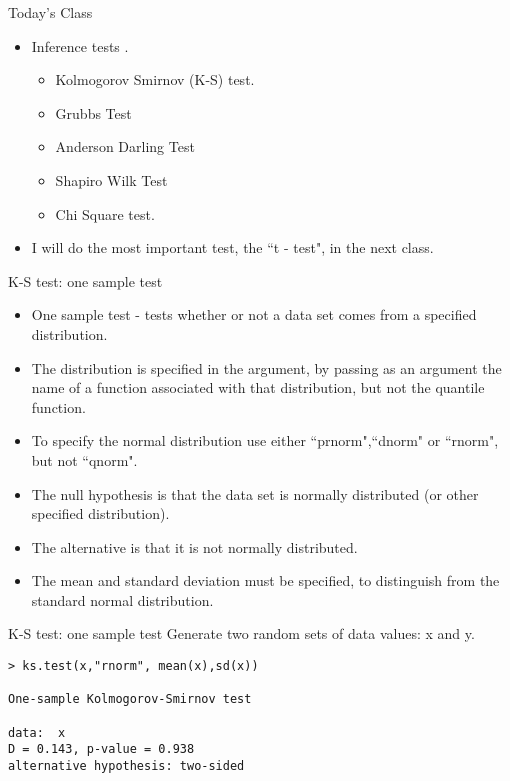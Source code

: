
{Today's Class}

\begin{itemize}
	\item Inference tests .
	\begin{itemize}
		\item Kolmogorov Smirnov (K-S) test.
		\item Grubbs Test
		\item Anderson Darling Test
		\item Shapiro Wilk Test
		\item Chi Square test.
	\end{itemize}
	\item I will do the most important test, the ``t - test", in the next class.
\end{itemize}




{K-S test: one sample test}

\begin{itemize}
	\item One sample test - tests whether or not a data set comes from a specified distribution.
	\item The distribution is specified in the argument, by passing as an argument the name of a function associated with that distribution, but not the quantile function.
	\item To specify the normal distribution use either ``prnorm",``dnorm" or ``rnorm", but not ``qnorm".
	\item The null hypothesis is that the data set is normally distributed (or other specified distribution).
	\item The alternative is that it is not normally distributed.
	\item The mean and standard deviation must be specified, to distinguish from the standard normal distribution.
	
\end{itemize}

{K-S test: one sample test}
Generate two random sets of data values: x and y.
\begin{verbatim}
> ks.test(x,"rnorm", mean(x),sd(x))

One-sample Kolmogorov-Smirnov test

data:  x
D = 0.143, p-value = 0.938
alternative hypothesis: two-sided

\end{verbatim}

